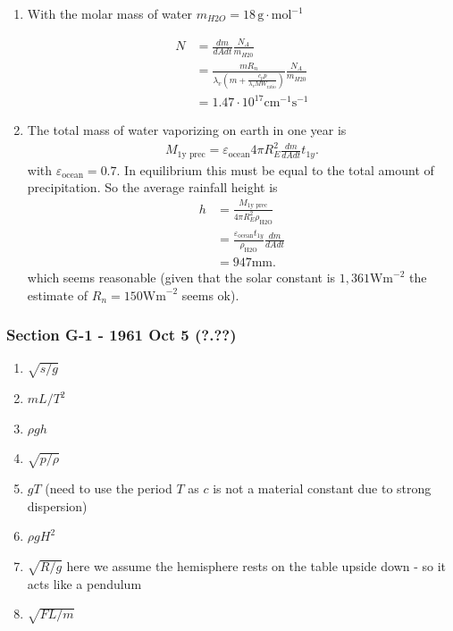 \documentclass[10pt,a4paper]{article}
\theoremstyle{definition}
\begin{document}
\begin{enumerate}[label=(\alph*)]
\item With the molar mass of water $m_{H2O}=18\,\text{g}\cdot\text{mol}^{-1}$

\begin{align}
    N&=\frac{dm}{dA dt} \frac{N_A}{m_{H20}}\\
    &=\frac{m R_n}{\lambda_v(m+\frac{c_p p}{\lambda_v MW_\text{ratio}})}\frac{N_A}{m_{H20}}\\
    &=1.47\cdot10^{17}\text{cm}^{-1}\text{s}^{-1}
\end{align}

\item The total mass of water vaporizing on earth in one year is
\begin{align}
    M_\text{1y prec}=\varepsilon_\text{ocean} 4\pi R_E^2  \frac{dm}{dA dt} t_{1y}.
\end{align}
with $\varepsilon_\text{ocean}=0.7$. In equilibrium this must be equal to the total amount of precipitation. So the average rainfall height is 
\begin{align}
    h&=\frac{M_\text{1y prec}}{4\pi R_E^2\rho_\text{H2O}}\\
    &=\frac{\varepsilon_\text{ocean}t_{1y}}{\rho_\text{H2O}} \frac{dm}{dA dt}\\
    &=947\text{mm}.
\end{align}
which seems reasonable (given that the solar constant is $1,361\text{Wm}^{-2}$ the estimate of $R_n=150\text{Wm}^{-2}$ seems ok).
\end{enumerate}

\subsubsection{Section G-1 - 1961 Oct 5 (?.??)}
\begin{enumerate}[label=(\alph*)]
    \item $\sqrt{s/g}$
    \item $mL/T^2$
    \item $\rho g h$
    \item $\sqrt{p/\rho}$
    \item $gT$ (need to use the period $T$ as $c$ is not a material constant due to strong dispersion)
    \item $\rho g H^2$
    \item $\sqrt{R/g}$ here we assume the hemisphere rests on the table upside down - so it acts like a pendulum 
    \item $\sqrt{FL/m}$
\end{enumerate}
\end{document}
